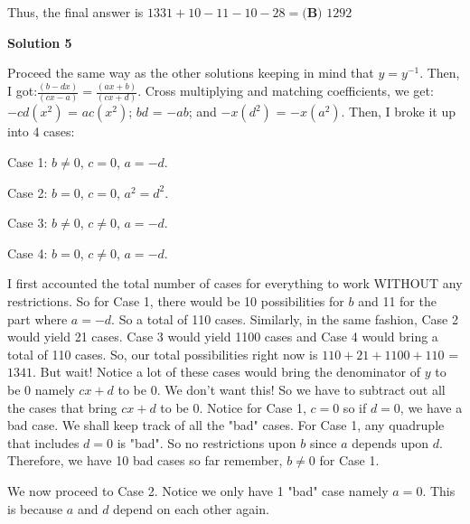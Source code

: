 \begin{enumerate}
 Thus, the final answer is $1331+10-11-10-28 =\boxed{\textbf{(B) }1292}$




\textbf{Solution 5}

Proceed the same way as the other solutions keeping in mind that ${y = y^{-1}}$. Then, I got:$\frac{(b - dx)}{(cx - a)} = \frac{(ax + b)}{(cx + d)}$. Cross multiplying and matching coefficients, we get:${-cd(x^{2})}$ = ${ac(x^{2})}$; ${bd}$ = ${-ab}$; and ${-x(d^{2})}$ = ${-x(a^{2})}$. Then, I broke it up into 4 cases:

 Case 1: ${b \neq 0}$, ${c = 0}$, ${a = -d}$. 

 Case 2: ${b = 0}$, ${c = 0}$, ${a^{2} = d^{2}}$.

 Case 3: ${b \neq 0}$, ${c \neq 0}$, ${a = -d}$.

 Case 4: ${b = 0}$, ${c \neq 0}$, ${a = -d}$.

 I first accounted the total number of cases for everything to work WITHOUT any restrictions. So for Case 1, there would be 10 possibilities for ${b}$ and 11 for the part where ${a = -d}$. So a total of 110 cases. Similarly, in the same fashion, Case 2 would yield 21 cases. Case 3 would yield 1100 cases and Case 4 would bring a total of 110 cases. So, our total possibilities right now is ${110 + 21 + 1100 + 110}$ = ${1341}$. But wait! Notice a lot of these cases would bring the denominator of ${y}$ to be 0 namely ${cx + d}$ to be 0. We don't want this! So we have to subtract out all the cases that bring ${cx + d}$ to be 0. Notice for Case 1, ${c = 0}$ so if ${d = 0}$, we have a bad case. We shall keep track of all the "bad" cases. For Case 1, any quadruple that includes ${d = 0}$ is "bad". So no restrictions upon ${b}$ since ${a}$ depends upon ${d}$. Therefore, we have 10 bad cases so far remember, ${b \neq 0}$ for Case 1. 

 We now proceed to Case 2. Notice we only have 1 "bad" case namely ${a = 0}$. This is because ${a}$ and ${d}$ depend on each other again. 


\end{enumerate}
